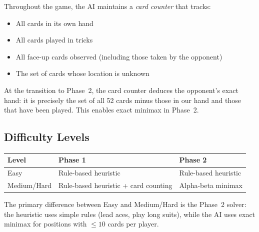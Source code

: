 Throughout the game, the AI maintains a \emph{card counter} that tracks:
\begin{itemize}
  \item All cards in its own hand
  \item All cards played in tricks
  \item All face-up cards observed (including those taken by the opponent)
  \item The set of cards whose location is unknown
\end{itemize}

At the transition to Phase~2, the card counter deduces the opponent's exact
hand: it is precisely the set of all 52 cards minus those in our hand and
those that have been played. This enables exact minimax in Phase~2.

\subsection{Difficulty Levels}

\begin{center}
\begin{tabular}{lll}
\toprule
Level & Phase 1 & Phase 2 \\
\midrule
Easy & Rule-based heuristic & Rule-based heuristic \\
Medium/Hard & Rule-based heuristic + card counting & Alpha-beta minimax \\
\bottomrule
\end{tabular}
\end{center}

The primary difference between Easy and Medium/Hard is the Phase~2 solver:
the heuristic uses simple rules (lead aces, play long suits), while the AI
uses exact minimax for positions with $\leq 10$ cards per player.

